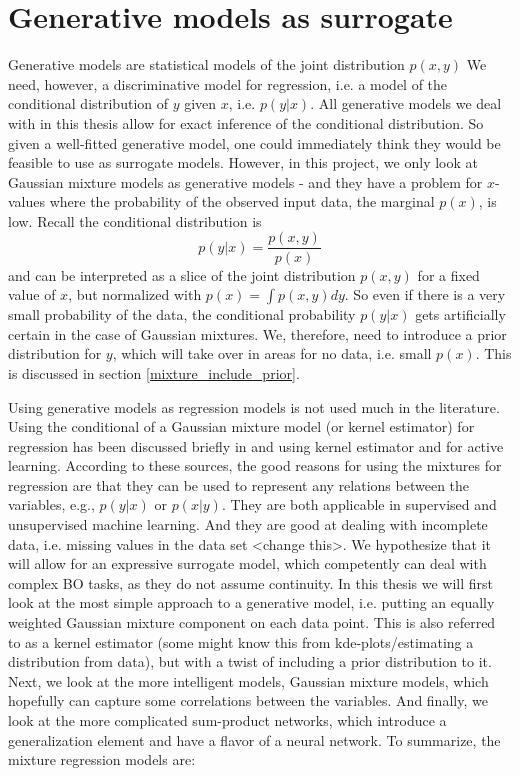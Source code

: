 \chapter{Generative models as surrogate}
Generative models are statistical models of the joint distribution $p(x,y)$ We need, however, a
discriminative model for regression, i.e. a model of the conditional distribution of $y$ given $x$,
i.e. $p(y|x)$. All generative models we deal with in this thesis allow for exact inference of the
conditional distribution. So given a well-fitted generative model, one could immediately think they
would be feasible to use as surrogate models. However, in this project, we only look at Gaussian
mixture models as generative models - and they have a problem for $x$-values where the probability
of the observed input data, the marginal $p(x)$, is low. Recall the conditional distribution is 
$$p(y|x) = \frac{p(x,y)}{p(x)}$$ and can be interpreted as a slice of the joint distribution
$p(x,y)$ for a fixed value of $x$, but normalized with $p(x) = \int p(x,y) dy$. So even if there is
a very small probability of the data, the conditional probability $p(y|x)$ gets artificially certain
in the case of Gaussian mixtures. We, therefore, need to introduce a prior distribution for $y$,
which will take over in areas for no data, i.e. small $p(x)$. This is discussed in section \ref{mixture_include_prior}.

Using generative models as regression models is not used much in the literature. Using the
conditional of a Gaussian mixture model (or kernel estimator) for regression has been discussed
briefly in \cite{bishop1995neural} and using kernel estimator \cite{ALStatisticalModels} and
\cite{JordanPaper} for active learning. According to these sources, the good reasons for using the
mixtures for regression are that they can be used to represent any relations between the variables,
e.g., $p(y|x)$ or $p(x|y)$. They are both applicable in supervised and unsupervised machine learning.
And they are good at dealing with incomplete data, i.e. missing values in the data set <change
this>. We hypothesize that it will allow for an expressive surrogate model, which competently
can deal with complex BO tasks, as they do not assume continuity. In this thesis we will first look
at the most simple approach to a generative model, i.e. putting an equally weighted Gaussian mixture
component on each data point. This is also referred to as a kernel estimator (some might know this 
from kde-plots/estimating a distribution from data), but with a twist of including a prior
distribution to it. Next, we look at the more intelligent models, Gaussian mixture models, which
hopefully can capture some correlations between the variables. And finally, we look at the more
complicated sum-product networks, which introduce a generalization element and have a flavor of a
neural network. To summarize, the mixture regression models are:

